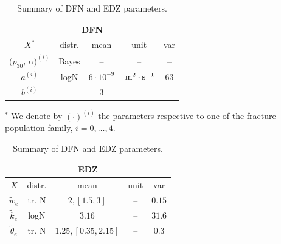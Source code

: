 \begin{table}[ht]
    \caption{Summary of DFN and EDZ parameters.}
    \label{tab:param_dfn_edz}
    \hfill
    \begin{minipage}[t]{0.45\textwidth}
        \centering
        \footnotesize
        \renewcommand{\arraystretch}{1.25}
        \begin{tabular}{ccccc}
        \toprule
        \multicolumn{5}{c}{DFN} \\
        \toprule
        $X^*$ & distr. & mean & unit & var \\
        \midrule
        $(p_{30}$, $\alpha)^{(i)}$ & Bayes & -- & -- & -- \\
        $a^{(i)}$ & logN & $6\cdot10^{-9}$& $\,\mathrm{m^2\cdot s^{-1}}$ & $63$ \\



        $b^{(i)}$ & -- & $3$ & -- & -- \\
        \bottomrule
        \end{tabular}
        $^*$ We denote by $(\cdot)^{(i)}$ the parameters respective to one of
        the fracture population family, $i=0,\ldots,4$.
    \end{minipage}
    \hspace{2em}
    \begin{minipage}[t]{0.45\textwidth}
        \centering
        \footnotesize
        \renewcommand{\arraystretch}{1.25}
        \begin{tabular}{ccccc}
        \toprule
        \multicolumn{5}{c}{EDZ} \\
        \toprule
        $X$ & distr. & mean & unit & var \\
        \midrule
        \(\tilde{w}_e\) & tr. N & $2, [1.5,3]$ & -- & $0.15$ \\
        \(\tilde k_e\) & logN & $3.16$ & -- & $31.6$ \\
        \(\tilde \theta_e\) & tr. N & $1.25, [0.35,2.15]$ & -- & $0.3$ \\
        \bottomrule
        \end{tabular}
    \end{minipage}
    \hfill
\end{table}

